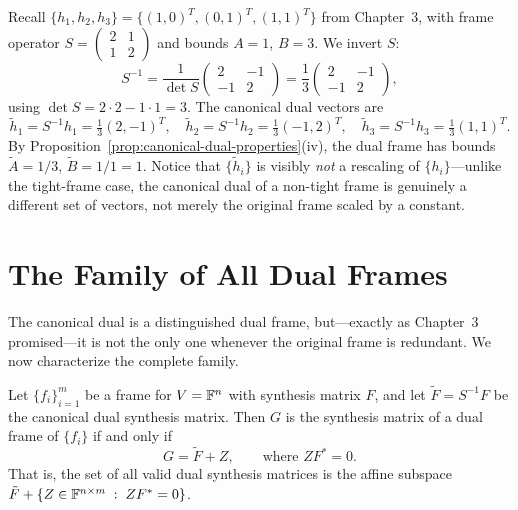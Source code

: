 \begin{examplebox}[title={Example 5.1: Canonical dual of the non-tight frame}]
\label{ex:canonical-dual-h}
Recall $\{h_1,h_2,h_3\}=\{(1,0)^T,(0,1)^T,(1,1)^T\}$ from Chapter~3, with
frame operator $S=\begin{pmatrix}2&1\\1&2\end{pmatrix}$ and bounds
$A=1$, $B=3$. We invert $S$:
\[
  S^{-1} = \frac{1}{\det S}\begin{pmatrix}2&-1\\-1&2\end{pmatrix}
  = \frac{1}{3}\begin{pmatrix}2&-1\\-1&2\end{pmatrix},
\]
using $\det S = 2\cdot2-1\cdot1=3$. The canonical dual vectors are
\[
  \tilde h_1 = S^{-1}h_1 = \tfrac13(2,-1)^T, \quad
  \tilde h_2 = S^{-1}h_2 = \tfrac13(-1,2)^T, \quad
  \tilde h_3 = S^{-1}h_3 = \tfrac13(1,1)^T.
\]
By Proposition~\ref{prop:canonical-dual-properties}(iv), the dual frame
has bounds $\tilde A = 1/3$, $\tilde B = 1/1 = 1$. Notice that
$\{\tilde h_i\}$ is visibly \emph{not} a rescaling of $\{h_i\}$---unlike
the tight-frame case, the canonical dual of a non-tight frame is
genuinely a different set of vectors, not merely the original frame
scaled by a constant.
\end{examplebox}

\section{The Family of All Dual Frames}
\label{sec:dual-family}

The canonical dual is a distinguished dual frame, but---exactly as
Chapter~3 promised---it is not the only one whenever the original frame
is redundant. We now characterize the complete family.

\begin{theorem}
\label{thm:dual-family}
Let $\{f_i\}_{i=1}^m$ be a frame for $V=\mathbb{F}^n$ with synthesis matrix $F$,
and let $\tilde F = S^{-1}F$ be the canonical dual synthesis matrix.
Then $G$ is the synthesis matrix of a dual frame of $\{f_i\}$ if and
only if
\begin{equation}
\label{eq:dual-family}
  G = \tilde F + Z, \qquad \text{where } Z F^* = 0.
\end{equation}
That is, the set of all valid dual synthesis matrices is the affine
subspace $\tilde F + \left\{ Z \in \mathbb{F}^{n\times m} \;:\; ZF^*=0 \right\}$.
\end{theorem}

